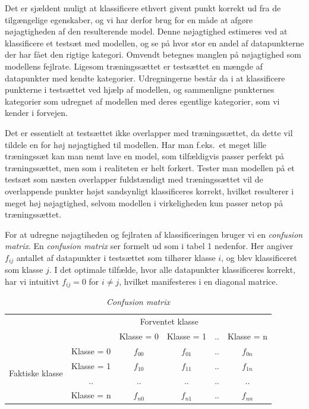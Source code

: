 \documentclass{article}
\begin{document}
Det er sjældent muligt at klassificere ethvert givent punkt korrekt ud fra de tilgængelige egenskaber, og vi har derfor brug for en måde at afgøre nøjagtigheden af den resulterende model. Denne nøjagtighed estimeres ved at klassificere et testsæt med modellen, og se på hvor stor en andel af datapunkterne der har fået den rigtige kategori. Omvendt betegnes manglen på nøjagtighed som modellens fejlrate. Ligesom træningssættet er testsættet en mængde af datapunkter med kendte kategorier. Udregningerne består da i at klassificere punkterne i testsættet ved hjælp af modellen, og sammenligne punkternes kategorier som udregnet af modellen med deres egentlige kategorier, som vi kender i forvejen.

Det er essentielt at testsættet ikke overlapper med træningssættet, da dette vil tildele en for høj nøjagtighed til modellen. Har man f.eks.\ et meget lille træningssæt kan man nemt lave en model, som tilfældigvis passer perfekt på træningssættet, men som i realiteten er helt forkert. Tester man modellen på et testsæt som næsten overlapper fuldstændigt med træningssættet vil de overlappende punkter højst sandsynligt klassificeres korrekt, hvilket resulterer i meget høj nøjagtighed, selvom modellen i virkeligheden kun passer netop på træningssættet. 

For at udregne nøjagtiheden og fejlraten af klassificeringen bruger vi en \textit{confusion matrix}. En \textit{confusion matrix} ser formelt ud som i tabel 1 nedenfor. Her angiver $f_{ij}$ antallet af datapunkter i testsættet som tilhører klasse $i$, og blev klassificeret som klasse $j$. I det optimale tilfælde, hvor alle datapunkter klassificeres korrekt, har vi intuitivt $f_{ij}=0$ for $i\neq j$, hvilket manifesteres i en diagonal matrice.\\

\begin{table}[H]
\begin{center}
\begin{tabular}{cc|c|c|c|c|}
    & \multicolumn{5}{c}{Forventet klasse} \\
    \cline{3-6}
     & & Klasse = 0 & Klasse = 1 & .. & Klasse = n \\
    \cline{2-6}
    \multicolumn{1}{c|}{\multirow{4}{*}{Faktiske klasse}} & Klasse = 0 & $f_{00}$ & $f_{01}$ & .. & $f_{0n}$ \\
    \cline{2-6}
    \multicolumn{1}{c|}{} & Klasse = 1 & $f_{10}$ & $f_{11}$ & .. & $f_{1n}$ \\
    \cline{2-6}
    \multicolumn{1}{c|}{} & .. & .. & .. & .. & .. \\
    \cline{2-6}
    \multicolumn{1}{c|}{} & Klasse = n & $f_{n0}$ & $f_{n1}$ & .. & $f_{nn}$ \\
    \cline{2-6}
\end{tabular}
\caption{\textit{Confusion matrix}}
\end{center}
\end{table}
\end{document}
